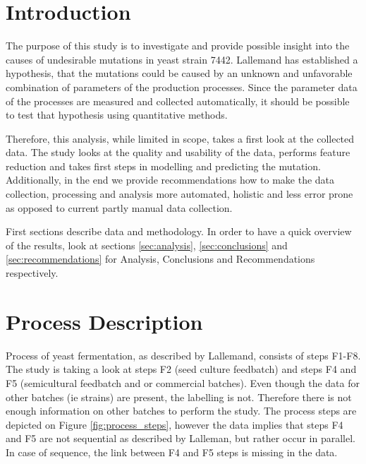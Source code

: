 \documentclass{article}
\begin{document}
    
\clearpage
{}
\tableofcontents
\listoffigures
\clearpage

\section{Introduction}
The purpose of this study is to investigate and provide possible insight into the causes of undesirable mutations in yeast strain 7442. Lallemand has established a hypothesis, that the mutations could be caused by an unknown and unfavorable combination of parameters of the production processes. Since the parameter data  of the processes are measured and collected automatically, it should be possible to test that hypothesis using quantitative methods.

Therefore, this analysis, while limited in scope, takes a first look at the collected data. The study looks at the quality and usability of the data, performs feature reduction and takes first steps in modelling and predicting the mutation. Additionally, in the end we provide recommendations how to make the data collection, processing and analysis more automated, holistic and less error prone as opposed to current partly manual data collection.

First sections describe data and methodology. In order to have a quick overview of the results, look at sections \ref{sec:analysis}, \ref{sec:conclusions} and \ref{sec:recommendations} for Analysis, Conclusions and Recommendations respectively.

\section{Process Description}
Process of yeast fermentation, as described by Lallemand, consists of steps F1-F8. The study is taking a look at steps F2 (seed culture feedbatch) and steps F4 and F5 (semicultural feedbatch and or commercial batches). Even though the data for other batches (ie strains) are present, the labelling is not. Therefore there is not enough information on other batches to perform the study. The process steps are depicted on Figure \ref{fig:process_steps}, however the data implies that steps F4 and F5 are not sequential as described by Lalleman, but rather occur in parallel. In case of sequence, the link between F4 and F5 steps is missing in the data.
\end{document}
